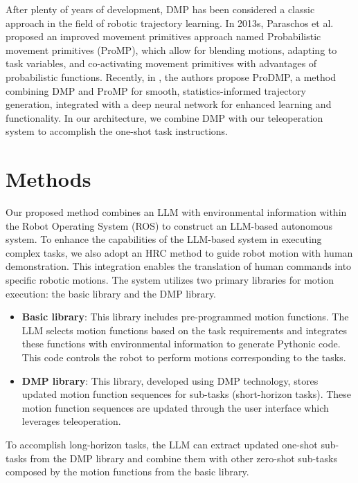 \documentclass[letterpaper,conference]{ieeeconf}
\begin{document}
After plenty of years of development, DMP has been considered a classic approach in the field of robotic trajectory learning. In 2013s, Paraschos et al. \cite{paraschos2013probabilistic} proposed an improved movement primitives approach named Probabilistic movement primitives (ProMP), which allow for blending motions, adapting to task variables, and co-activating movement primitives with advantages of probabilistic functions. Recently, in \cite{10050558}, the authors propose ProDMP, a method combining DMP and ProMP for smooth, statistics-informed trajectory generation, integrated with a deep neural network for enhanced learning and functionality.
In our architecture, we combine DMP with our teleoperation system to accomplish the one-shot task instructions.
\section{Methods}
Our proposed method combines an LLM with environmental information within the Robot Operating System (ROS) to construct an LLM-based autonomous system. To enhance the capabilities of the LLM-based system in executing complex tasks, we also adopt an HRC method to guide robot motion with human demonstration. This integration enables the translation of human commands into specific robotic motions. The system utilizes two primary libraries for motion execution: the basic library and the DMP library.
\begin{itemize}
    \item[] \textbf{Basic library}: This library includes pre-programmed motion functions. The LLM selects motion functions based on the task requirements and integrates these functions with environmental information to generate Pythonic code. This code controls the robot to perform motions corresponding to the tasks.
    \item[] \textbf{DMP library}: This library, developed using DMP technology, stores updated motion function sequences for sub-tasks (short-horizon tasks). These motion function sequences are updated through the user interface which leverages teleoperation.
\end{itemize}

To accomplish long-horizon tasks, the LLM can extract updated one-shot sub-tasks from the DMP library and combine them with other zero-shot sub-tasks composed by the motion functions from the basic library.
\end{document}
